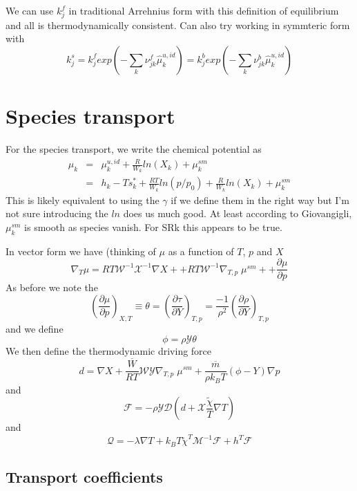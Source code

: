 \documentclass[11pt]{article}
\newcommand{\MarginPar}[1]{\marginpar{%
\vskip-\baselineskip %
\raggedright\tiny\sffamily
\hrule\smallskip{\color{red}#1}\par\smallskip\hrule}}
\newcommand{\HeatFlux}{\boldsymbol{\mathcal{Q}}}
\newcommand{\SpeciesFlux}{\boldsymbol{\mathcal{F}}}
\newcommand{\mbar}{\overline{m}}
\begin{document}
We can use $k_j^f$ in traditional Arrehnius form with this definition of equilibrium and all is thermodynamically
consistent.  Can also try working in symmteric form with
\[
k_j^s
=  k_j^f 
exp( - \sum_k \nu_{jk}^f \hat{\mu}_k^{u,id})
=  k_j^b 
exp( -  \sum_k \nu_{jk}^b \hat{\mu}_k^{u,id})
\]

\section{Species transport}
\MarginPar{need to fix this}

For the species transport, we write the chemical potential as
\begin{eqnarray}
\label{eq:muk_sm}
\mu_k &=& \mu_k^{u,id} + \frac{R}{W_k} ln(X_k)  +  \mu_k^{sm} \\
 &=& h_k - T s_k^* + \frac{R T}{W_k} ln(p/p_0) + \frac{R}{W_k} ln(X_k) + \mu_k^{sm}
\end{eqnarray}
This is likely equivalent to using the $\gamma$ if we define them in the right way but I'm not sure
introducing the $ln$ does us much good.
At least according to Giovangigli, $\mu_k^{sm}$ is smooth as species vanish.  For SRk this appears to be true.

In vector form we have (thinking of $\mu$ as a function of $T$, $p$ and $X$
\begin{equation}
\nabla_T \mu
= R T \mathcal{W}^{-1} \mathcal{X}^{-1} \nabla X +
+ R T \mathcal{W}^{-1} \nabla_{T,p} \; \mu^{sm} +
+ \frac{\partial \mu}{\partial p}
\end{equation}
As before we note the
\[
\left(\frac{\partial \mu}{\partial p}\right)_{X,T} \equiv \theta = \left(\frac{ \partial \tau}{\partial Y}\right)_{T,p}
 =
\frac{-1}{\rho^2}\left (\frac{\partial \rho}{\partial Y} \right)_{T,p}
\]
and we define
\[
\label{eq:transp_gradp_multiplier}
\phi = \rho \mathcal{Y} \theta
\]
We then define the thermodynamic driving force
\[
d = \nabla X  + \frac{\overline{W}}{R T} \mathcal{W} \mathcal{Y} \nabla_{T,p} \; \mu^{sm}  + \frac{\mbar}{\rho k_B T} (\phi - Y) \nabla p
\]
and
\[
\mathcal{F} = - \rho \mathcal{Y} \mathcal{D} ( d + \mathcal{X} \frac{ \tilde{\chi}}{T} \nabla T)
\]
and
\[
\HeatFlux = - \lambda \nabla T + k_B T {\tilde{\chi}}^T \mathcal{M}^{-1} \SpeciesFlux + h^T \SpeciesFlux
\]

\subsection{Transport coefficients}
\end{document}
